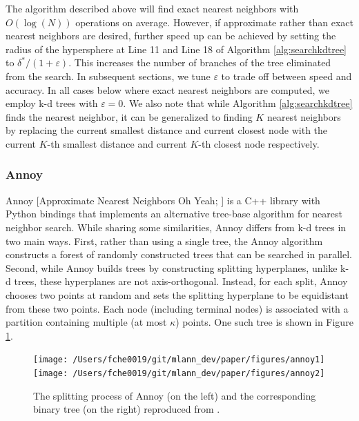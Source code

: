 \documentclass[11pt,a4paper,]{article}
\begin{document}
The algorithm described above will find exact nearest neighbors with \(O(\log(N))\) operations on average. However, if approximate rather than exact nearest neighbors are desired, further speed up can be achieved by setting the radius of the hypersphere at Line 11 and Line 18 of Algorithm \ref{alg:searchkdtree} to \(\delta^*/(1+\varepsilon)\). This increases the number of branches of the tree eliminated from the search. In subsequent sections, we tune \(\varepsilon\) to trade off between speed and accuracy. In all cases below where exact nearest neighbors are computed, we employ k-d trees with \(\varepsilon=0\). We also note that while Algorithm \ref{alg:searchkdtree} finds the nearest neighbor, it can be generalized to finding \(K\) nearest neighbors by replacing the current smallest distance and current closest node with the current \(K\)-th smallest distance and current \(K\)-th closest node respectively.

\hypertarget{annoy}{%
\subsubsection*{Annoy}\label{annoy}}

Annoy {[}Approximate Nearest Neighbors Oh Yeah; \textcite{Bernhardsson2016-tf}{]} is a C++ library with Python bindings that implements an alternative tree-base algorithm for nearest neighbor search. While sharing some similarities, Annoy differs from k-d trees in two main ways. First, rather than using a single tree, the Annoy algorithm constructs a forest of randomly constructed trees that can be searched in parallel. Second, while Annoy builds trees by constructing splitting hyperplanes, unlike k-d trees, these hyperplanes are not axis-orthogonal. Instead, for each split, Annoy chooses two points at random and sets the splitting hyperplane to be equidistant from these two points. Each node (including terminal nodes) is associated with a partition containing multiple (at most \(\kappa\)) points. One such tree is shown in Figure \ref{fig:annoy}.



\begin{figure}

{\centering \texttt{[image: /Users/fche0019/git/mlann\_dev/paper/figures/annoy1]} \texttt{[image: /Users/fche0019/git/mlann\_dev/paper/figures/annoy2]} 

}

\caption{The splitting process of Annoy (on the left) and the corresponding binary tree (on the right) reproduced from \textcite{Bernhardsson2015-slides}.}\label{fig:annoy}
\end{figure}
\end{document}
